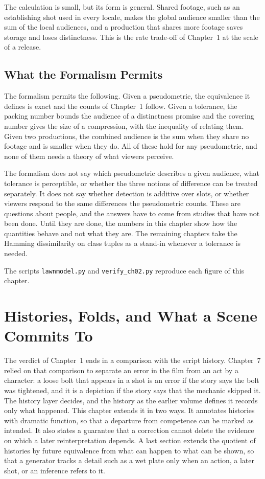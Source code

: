 \documentclass[11pt,twoside,openright]{book}
\theoremstyle{plain}
\theoremstyle{definition}
\theoremstyle{remark}
\begin{document}
The calculation is small, but its form is general. Shared footage, such as an establishing shot used in every locale, makes the global audience smaller than the sum of the local audiences, and a production that shares more footage saves storage and loses distinctness. This is the rate trade-off of Chapter~1 at the scale of a release.

\section{What the Formalism Permits}\label{sec:permits}

The formalism permits the following. Given a pseudometric, the equivalence it defines is exact and the counts of Chapter~1 follow. Given a tolerance, the packing number bounds the audience of a distinctness promise and the covering number gives the size of a compression, with the inequality of  relating them. Given two productions, the combined audience is the sum when they share no footage and is smaller when they do. All of these hold for any pseudometric, and none of them needs a theory of what viewers perceive.

The formalism does not say which pseudometric describes a given audience, what tolerance is perceptible, or whether the three notions of difference can be treated separately. It does not say whether detection is additive over slots, or whether viewers respond to the same differences the pseudometric counts. These are questions about people, and the answers have to come from studies that have not been done. Until they are done, the numbers in this chapter show how the quantities behave and not what they are. The remaining chapters take the Hamming dissimilarity on class tuples as a stand-in whenever a tolerance is needed.

The scripts \texttt{lawnmodel.py} and \texttt{verify\_ch02.py} reproduce each figure of this chapter.

\chapter{Histories, Folds, and What a Scene Commits To}
\label{ch:histories}

The verdict of Chapter~1 ends in a comparison with the script history. Chapter~7 relied on that comparison to separate an error in the film from an act by a character: a loose bolt that appears in a shot is an error if the story says the bolt was tightened, and it is a depiction if the story says that the mechanic skipped it. The history layer decides, and the history as the earlier volume defines it records only what happened. This chapter extends it in two ways. It annotates histories with dramatic function, so that a departure from competence can be marked as intended. It also states a guarantee that a correction cannot delete the evidence on which a later reinterpretation depends. A last section extends the quotient of histories by future equivalence from what can happen to what can be shown, so that a generator tracks a detail such as a wet plate only when an action, a later shot, or an inference refers to it.
\end{document}
